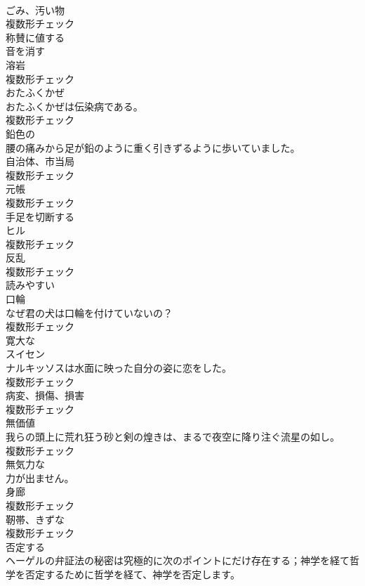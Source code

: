\documentclass[8pt]{extreport}
\begin{document}
\begin{CJK}{UTF8}{min}
\\	[名詞]	ごみ、汚い物	
\\	複数形チェック
\\	[形容詞]	称賛に値する	
\\	[動詞]	音を消す	
\\	[名詞]	溶岩	
\\	複数形チェック
\\	[名詞]	おたふくかぜ	
\\	おたふくかぜは伝染病である。	
\\	複数形チェック
\\	[形容詞]	鉛色の	
\\	腰の痛みから足が鉛のように重く引きずるように歩いていました。	
\\	[名詞]	自治体、市当局	
\\	複数形チェック
\\	[名詞]	元帳	
\\	複数形チェック
\\	[動詞]	手足を切断する	
\\	[名詞]	ヒル	
\\	複数形チェック
\\	[名詞]	反乱	
\\	複数形チェック
\\	[形容詞]	読みやすい	
\\	[名詞]	口輪	
\\	なぜ君の犬は口輪を付けていないの？	
\\	複数形チェック
\\	[形容詞]	寛大な	
\\	[名詞]	スイセン	
\\	ナルキッソスは水面に映った自分の姿に恋をした。	
\\	複数形チェック
\\	[名詞]	病変、損傷、損害	
\\	複数形チェック
\\	[名詞]	無価値	
\\	我らの頭上に荒れ狂う砂と剣の煌きは、まるで夜空に降り注ぐ流星の如し。	
\\	複数形チェック
\\	[形容詞]	無気力な	
\\	力が出ません。	
\\	[名詞]	身廊	
\\	複数形チェック
\\	[名詞]	靭帯、きずな	
\\	複数形チェック
\\	[動詞]	否定する	
\\	ヘーゲルの弁証法の秘密は究極的に次のポイントにだけ存在する；神学を経て哲学を否定するために哲学を経て、神学を否定します。	

\end{CJK}
\end{document}
